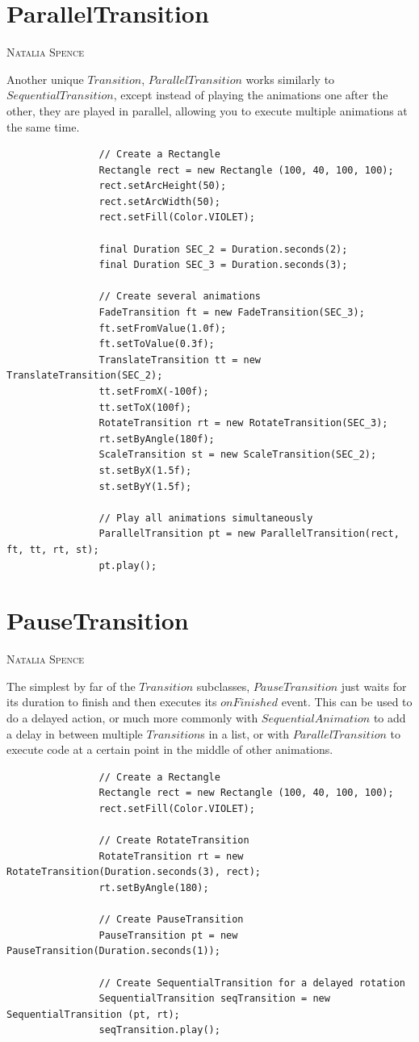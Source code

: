\documentclass[a4paper]{report}
\makeatletter
\newcommand{\sectionauthor}[1]{%
	{\parindent0pt\vspace*{0pt}%
		\linespread{1.1}\large\scshape#1%
		\par\nobreak\vspace*{10pt}}
	\@afterheading%
}
\makeatother
\begin{document}
		\pagebreak
		
		\section{ParallelTransition}\label{sec:parallel transition}
		\sectionauthor{Natalia Spence}
		
			Another unique $Transition$, $ParallelTransition$ works similarly to $SequentialTransition$, except instead of playing the animations one after the other, they are played in parallel, allowing you to execute multiple animations at the same time.
			
			\begin{lstlisting}
				// Create a Rectangle
				Rectangle rect = new Rectangle (100, 40, 100, 100);
				rect.setArcHeight(50);
				rect.setArcWidth(50);
				rect.setFill(Color.VIOLET);
				
				final Duration SEC_2 = Duration.seconds(2);
				final Duration SEC_3 = Duration.seconds(3);
				
				// Create several animations
				FadeTransition ft = new FadeTransition(SEC_3);
				ft.setFromValue(1.0f);
				ft.setToValue(0.3f);
				TranslateTransition tt = new TranslateTransition(SEC_2);
				tt.setFromX(-100f);
				tt.setToX(100f);
				RotateTransition rt = new RotateTransition(SEC_3);
				rt.setByAngle(180f);
				ScaleTransition st = new ScaleTransition(SEC_2);
				st.setByX(1.5f);
				st.setByY(1.5f);
				
				// Play all animations simultaneously
				ParallelTransition pt = new ParallelTransition(rect, ft, tt, rt, st);
				pt.play();
			\end{lstlisting}
		
		\section{PauseTransition}\label{sec:pause transition}
		\sectionauthor{Natalia Spence}
			
			The simplest by far of the $Transition$ subclasses, $PauseTransition$ just waits for its duration to finish and then executes its $onFinished$ event. This can be used to do a delayed action, or much more commonly with $SequentialAnimation$ to add a delay in between multiple $Transition$s in a list, or with $ParallelTransition$ to execute code at a certain point in the middle of other animations.
			
			
			\begin{lstlisting}
				// Create a Rectangle
				Rectangle rect = new Rectangle (100, 40, 100, 100);
				rect.setFill(Color.VIOLET);
				
				// Create RotateTransition
				RotateTransition rt = new RotateTransition(Duration.seconds(3), rect);
				rt.setByAngle(180);
				
				// Create PauseTransition
				PauseTransition pt = new PauseTransition(Duration.seconds(1));
				
				// Create SequentialTransition for a delayed rotation
				SequentialTransition seqTransition = new SequentialTransition (pt, rt);
				seqTransition.play();
			\end{lstlisting}
	
\end{document}
